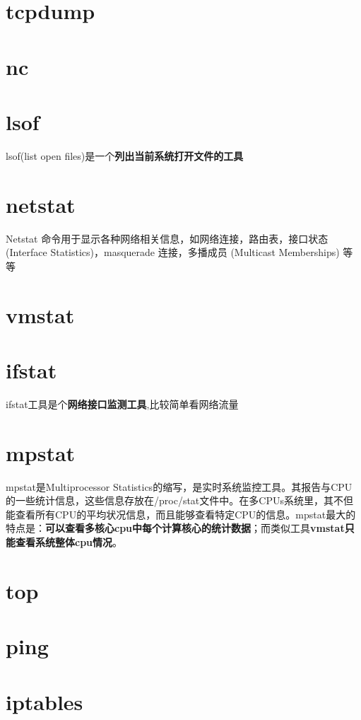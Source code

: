 \documentclass[UTF8,a4paper,8pt]{ctexbook}
\begin{document}
	\section{tcpdump}
	
	\section{nc}
	
	\section{lsof}lsof(list open files)是一个\textbf{列出当前系统打开文件的工具}
	
	\section{netstat}Netstat 命令用于显示各种网络相关信息，如网络连接，路由表，接口状态 (Interface Statistics)，masquerade 连接，多播成员 (Multicast Memberships) 等等
	
	\section{vmstat}
	
	\section{ifstat}ifstat工具是个\textbf{网络接口监测工具},比较简单看网络流量
	
	\section{mpstat}mpstat是Multiprocessor Statistics的缩写，是实时系统监控工具。其报告与CPU的一些统计信息，这些信息存放在/proc/stat文件中。在多CPUs系统里，其不但能查看所有CPU的平均状况信息，而且能够查看特定CPU的信息。mpstat最大的特点是：\textbf{可以查看多核心cpu中每个计算核心的统计数据}；而类似工具\textbf{vmstat只能查看系统整体cpu情况}。
	
	\section{top}
	
	\section{ping}
	
	\section{iptables}
	
\end{document}
